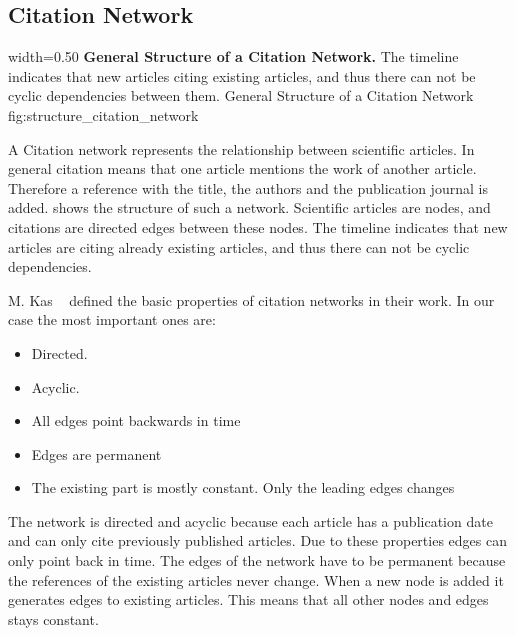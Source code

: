 \subsection{Citation Network}
\label{sec:citation_network}

      {width=0.50\textwidth}
      {\textbf{General Structure of a Citation Network.} The timeline indicates that new articles citing existing articles, and thus there can not be cyclic dependencies between them.}
      {General Structure of a Citation Network}
      {fig:structure_citation_network}

A Citation network represents the relationship between scientific articles. In general citation means that one article mentions the work of another article. Therefore a
reference with the title, the authors and the publication journal is added.  shows the structure of such a network. Scientific articles are nodes, and citations are directed edges between these nodes. The timeline indicates that new articles are citing already existing articles, and thus there can not be cyclic dependencies.

M. Kas ~\cite{kas2011} defined the basic properties of citation networks in their work. In our case the most important ones are:

\begin{itemize}
  \item Directed.
  \item Acyclic.
  \item All edges point backwards in time
  \item Edges are permanent
  \item The existing part is mostly constant. Only the leading edges changes
\end{itemize}

The network is directed and acyclic because each article has a publication date and can only cite previously published articles. Due to these properties edges can only point back in time. The edges of the network have to be permanent because the references of the existing articles never change. When a new node is added it generates edges to existing articles. This means that all other nodes and edges stays constant.

